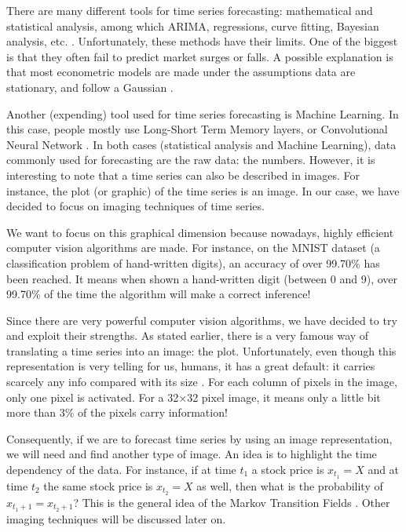 \documentclass[11pt]{article}
\begin{document}
\begin{onehalfspace}
There are many different tools for time series forecasting: mathematical and statistical analysis, among which ARIMA, regressions, curve fitting, Bayesian analysis, etc. \cite{campanharo}. Unfortunately, these methods have their limits. One of the biggest is that they often fail to predict market surges or falls. A possible explanation is that most econometric models are made under the assumptions data are stationary, and follow a Gaussian \cite{arima}. 

Another (expending) tool used for time series forecasting is Machine Learning. In this case, people mostly use Long-Short Term Memory layers, or Convolutional Neural Network \cite{conv_lstm}. In both cases (statistical analysis and Machine Learning), data commonly used for forecasting are the raw data: the numbers. However, it is interesting to note that a time series can also be described in images. For instance, the plot (or graphic) of the time series is an image. In our case, we have decided to focus on imaging techniques of time series.

We want to focus on this graphical dimension because nowadays, highly efficient computer vision algorithms are made. For instance, on the MNIST dataset (a classification problem of hand-written digits), an accuracy of over 99.70\% has been reached. It means when shown a hand-written digit (between 0 and 9), over 99.70\% of the time the algorithm will make a correct inference! 

Since there are very powerful computer vision algorithms, we have decided to try and exploit their strengths. As stated earlier, there is a very famous way of translating a time series into an image: the plot. Unfortunately, even though this representation is very telling for us, humans, it has a great default: it carries scarcely any info compared with its size \cite{jastrzebska}. For each column of pixels in the image, only one pixel is activated. For a 32$\times$32 pixel image, it means only a little bit more than 3\% of the pixels carry information!

Consequently, if we are to forecast time series by using an image representation, we will need and find another type of image. An idea is to highlight the time dependency of the data. For instance, if at time $t_1$ a stock price is $x_{t_1} = X$ and at time $t_2$ the same stock price is $x_{t_2} = X$ as well, then what is the probability of $x_{t_1 + 1} = x_{t_2 + 1}$? This is the general idea of the Markov Transition Fields \cite{wang}. Other imaging techniques will be discussed later on.


\end{onehalfspace}
\end{document}
